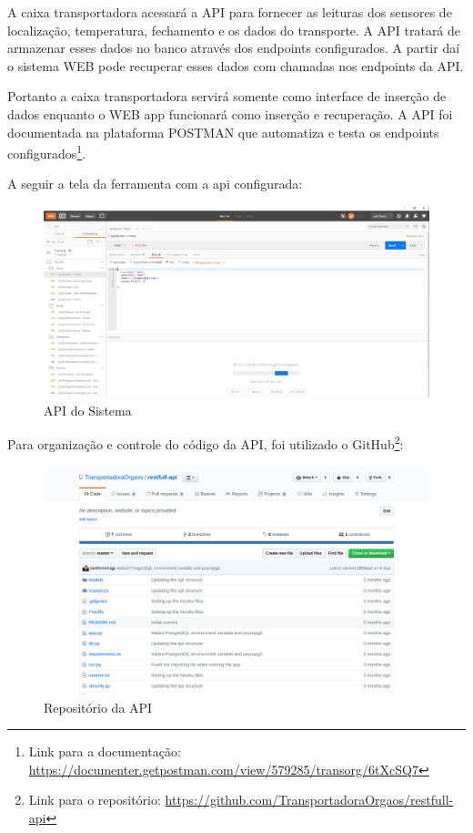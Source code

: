 			A caixa transportadora acessará a API para fornecer as leituras dos sensores de localização, temperatura, fechamento e os dados do transporte. A API tratará de armazenar esses dados no banco através dos endpoints configurados. A partir daí o sistema WEB pode recuperar esses dados com chamadas nos endpoints da API. 
			
			Portanto a caixa transportadora servirá somente como interface de inserção de dados enquanto o WEB app funcionará como inserção e recuperação. A API foi documentada na plataforma POSTMAN que automatiza e testa os endpoints configurados\footnote{Link para a documentação: \href{https://documenter.getpostman.com/view/579285/transorg/6tXcSQ7}{https://documenter.getpostman.com/view/579285/transorg/6tXcSQ7} }. 
			
			A seguir a tela da ferramenta com a api configurada:
			
			\begin{figure}[H]
				\centering
				\includegraphics[width=16cm]{figuras/api_software.JPG}
				\caption{API do Sistema}
			\end{figure}
		
			Para organização e controle do código da API, foi utilizado o GitHub\footnote{Link para o repositório: \href{https://github.com/TransportadoraOrgaos/restfull-api}{https://github.com/TransportadoraOrgaos/restfull-api}}:
			
			\begin{figure}[H]
				\centering
				\includegraphics[width=16cm]{figuras/git_rest_api.png}
				\caption{Repositório da API}
			\end{figure}
			
